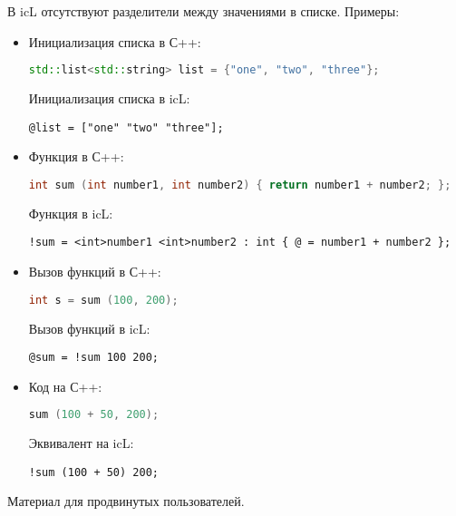 \documentclass[a4paper, 14pt]{extarticle}
\newenvironment{icItems}
	{ \begin{itemize} [noitemsep,nolistsep] }
	{ \end{itemize} }
\begin{document}
	В icL отсутствуют разделители между значениями в списке. Примеры:
	\begin{icItems}
  \item Инициализация списка в С++:
	\begin{lstlisting}[numbers=none, language=C++]
std::list<std::string> list = {"one", "two", "three"};
	\end{lstlisting}
	Инициализация списка в icL:
	\begin{lstlisting}[numbers=none]
@list = ["one" "two" "three"];
	\end{lstlisting}
  \item Функция в С++:
	\begin{lstlisting}[numbers=none, language=C++]
int sum (int number1, int number2) { return number1 + number2; };
	\end{lstlisting}
	Функция в icL:
	\begin{lstlisting}[numbers=none]
!sum = <int>number1 <int>number2 : int { @ = number1 + number2 };
	\end{lstlisting}
  \item Вызов функций в С++:
	\begin{lstlisting}[numbers=none, language=C++]
int s = sum (100, 200);
	\end{lstlisting}
	Вызов функций в icL:
	\begin{lstlisting}[numbers=none]
@sum = !sum 100 200;
	\end{lstlisting}
  \item Код на С++:
	\begin{lstlisting}[numbers=none, language=C++]
sum (100 + 50, 200);
	\end{lstlisting}
	Эквивалент на icL:
	  \begin{lstlisting}[numbers=none]
!sum (100 + 50) 200;
	\end{lstlisting}
	\end{icItems}
  
	\newpage
	{\color{red}Материал для продвинутых пользователей.}
  	
\end{document}
